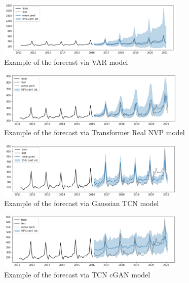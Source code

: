 \documentclass[12pt,a4paper]{article}
\begin{document}
\begin{figure}[!ht]
    \centering
    \includegraphics[width=0.8\textwidth]{figures/var.png}
    \caption{Example of the forecast via VAR model}
    \label{fig:var}
\end{figure}

\begin{figure}[!ht]
    \centering
    \includegraphics[width=0.8\textwidth]{figures/transformer_realnvp.png}
    \caption{Example of the forecast via Transformer Real NVP model}
    \label{fig:transformer_realnvp}
\end{figure}

\begin{figure}[!ht]
    \centering
    \includegraphics[width=0.8\textwidth]{figures/gaussian_tcn.png}
    \caption{Example of the forecast via Gaussian TCN model}
    \label{fig:gaussian_tcn}
\end{figure}

\begin{figure}[!ht]
    \centering
    \includegraphics[width=0.8\textwidth]{figures/tcn_cgan.png}
    \caption{Example of the forecast via TCN cGAN model}
    \label{fig:tcn_cgan}
\end{figure}
\end{document}
